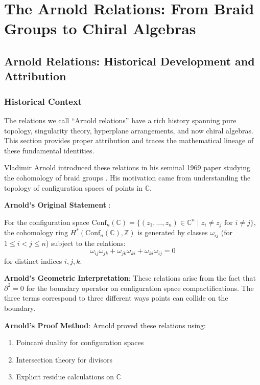 \appendix
\chapter{The Arnold Relations: From Braid Groups to Chiral Algebras}


\section{Arnold Relations: Historical Development and Attribution}
\label{sec:arnold-historical}

\subsection{Historical Context}

The relations we call ``Arnold relations'' have a rich history spanning pure topology, 
singularity theory, hyperplane arrangements, and now chiral algebras. This section provides 
proper attribution and traces the mathematical lineage of these fundamental identities.

\begin{historical}
Vladimir Arnold introduced these relations in his seminal 1969 paper studying the cohomology 
of braid groups \cite{Arnold69}. His motivation came from understanding the topology of 
configuration spaces of points in $\mathbb{C}$.

\textbf{Arnold's Original Statement} \cite{Arnold69, Theorem 3}:

For the configuration space $\text{Conf}_n(\mathbb{C}) = \{(z_1, \ldots, z_n) \in \mathbb{C}^n 
\mid z_i \neq z_j \text{ for } i \neq j\}$, the cohomology ring $H^*(\text{Conf}_n(\mathbb{C}), 
\mathbb{Z})$ is generated by classes $\omega_{ij}$ (for $1 \leq i < j \leq n$) subject to 
the relations:
\begin{equation}\label{eq:arnold-original}
\omega_{ij} \omega_{jk} + \omega_{jk} \omega_{ki} + \omega_{ki} \omega_{ij} = 0
\end{equation}
for distinct indices $i, j, k$.

\textbf{Arnold's Geometric Interpretation}:
These relations arise from the fact that $\partial^2 = 0$ for the boundary operator on 
configuration space compactifications. The three terms correspond to three different ways 
points can collide on the boundary.

\textbf{Arnold's Proof Method}:
Arnold proved these relations using:
\begin{enumerate}
\item Poincaré duality for configuration spaces
\item Intersection theory for divisors
\item Explicit residue calculations on $\mathbb{C}$
\end{enumerate}
\end{historical}

